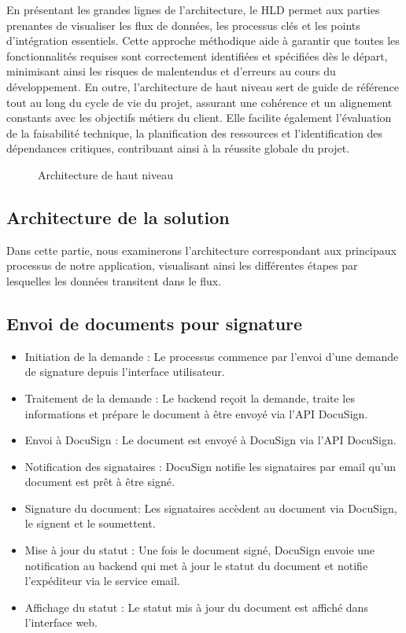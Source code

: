 En présentant les grandes lignes de l’architecture, le HLD permet aux parties prenantes de visualiser les flux de données, les processus clés et les points d’intégration essentiels. Cette approche méthodique aide à garantir que toutes les fonctionnalités requises sont correctement identifiées et spécifiées dès le départ, minimisant ainsi les risques de malentendus et d’erreurs au cours du développement. En outre, l’architecture de haut niveau sert de guide de référence tout au long du cycle de vie du projet, assurant une cohérence et un alignement constants avec les objectifs métiers du client. Elle facilite également l’évaluation de la faisabilité technique, la planification des ressources et l’identification des dépendances critiques, contribuant ainsi à la réussite globale du projet.


\begin{figure}[H]
\begin{center}
\end{center}
\caption{Architecture de haut niveau}
\end{figure}


\subsection{ Architecture de la solution}

Dans cette partie, nous examinerons l’architecture correspondant aux principaux processus de notre application, visualisant ainsi les différentes étapes par lesquelles les données transitent dans le flux.

\subsection{ Envoi de documents pour signature}
\begin{itemize}

\item Initiation de la demande :
Le processus commence par l'envoi d'une demande de signature depuis l'interface utilisateur.
\item Traitement de la demande :
Le backend reçoit la demande, traite les informations et prépare le document à être envoyé via l'API DocuSign.
\item Envoi à DocuSign : 
Le document est envoyé à DocuSign via l'API DocuSign.
\item Notification des signataires :
DocuSign notifie les signataires par email qu'un document est prêt à être signé.
\item Signature du document:
Les signataires accèdent au document via DocuSign, le signent et le soumettent.
\item Mise à jour du statut :
Une fois le document signé, DocuSign envoie une notification au backend qui met à jour le statut du document et notifie l'expéditeur via le service email.
\item Affichage du statut :
Le statut mis à jour du document est affiché dans l'interface web.
\end{itemize}

